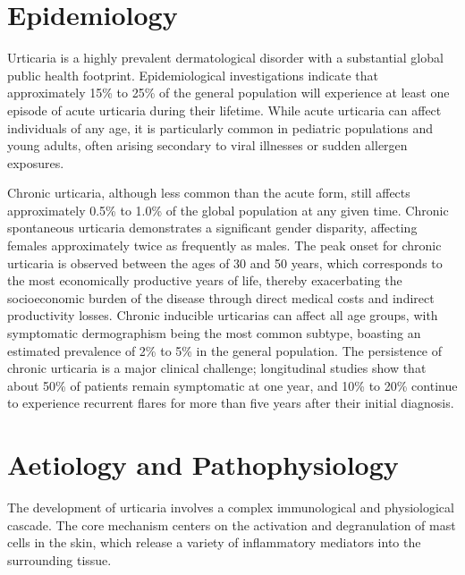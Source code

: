 \section*{Epidemiology}
Urticaria is a highly prevalent dermatological disorder with a substantial global public health footprint. Epidemiological investigations indicate that approximately 15\% to 25\% of the general population will experience at least one episode of acute urticaria during their lifetime. While acute urticaria can affect individuals of any age, it is particularly common in pediatric populations and young adults, often arising secondary to viral illnesses or sudden allergen exposures.

Chronic urticaria, although less common than the acute form, still affects approximately 0.5\% to 1.0\% of the global population at any given time. Chronic spontaneous urticaria demonstrates a significant gender disparity, affecting females approximately twice as frequently as males. The peak onset for chronic urticaria is observed between the ages of 30 and 50 years, which corresponds to the most economically productive years of life, thereby exacerbating the socioeconomic burden of the disease through direct medical costs and indirect productivity losses. Chronic inducible urticarias can affect all age groups, with symptomatic dermographism being the most common subtype, boasting an estimated prevalence of 2\% to 5\% in the general population. The persistence of chronic urticaria is a major clinical challenge; longitudinal studies show that about 50\% of patients remain symptomatic at one year, and 10\% to 20\% continue to experience recurrent flares for more than five years after their initial diagnosis.

\section*{Aetiology and Pathophysiology}
The development of urticaria involves a complex immunological and physiological cascade. The core mechanism centers on the activation and degranulation of mast cells in the skin, which release a variety of inflammatory mediators into the surrounding tissue.

